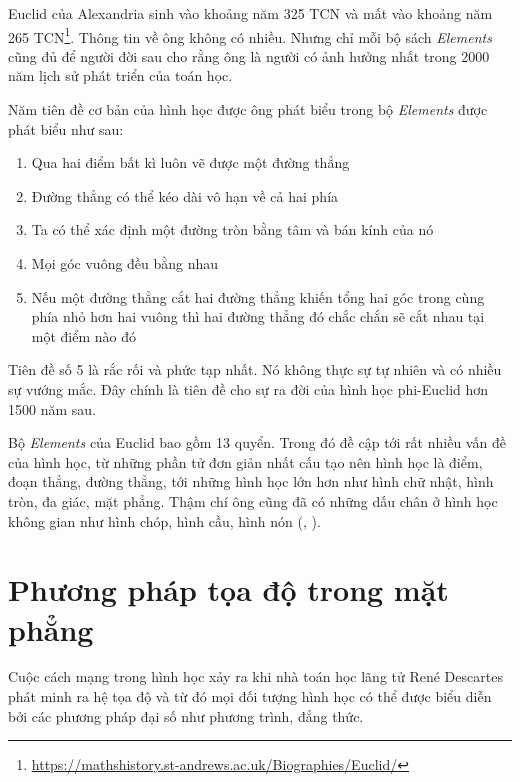 Euclid của Alexandria sinh vào khoảng năm 325 TCN và mất vào khoảng năm 265 TCN\footnote{\url{https://mathshistory.st-andrews.ac.uk/Biographies/Euclid/}}. Thông tin về ông không có nhiều. Nhưng chỉ mỗi bộ sách \textit{Elements} cũng đủ để người đời sau cho rằng ông là người có ảnh hưởng nhất trong 2000 năm lịch sử phát triển của toán học.

Năm tiên đề cơ bản của hình học được ông phát biểu trong bộ \textit{Elements} được phát biểu như sau:

\begin{enumerate}
	\item Qua hai điểm bất kì luôn vẽ được một đường thẳng
	\item Đường thẳng có thể kéo dài vô hạn về cả hai phía
	\item Ta có thể xác định một đường tròn bằng tâm và bán kính của nó
	\item Mọi góc vuông đều bằng nhau
	\item Nếu một đường thẳng cắt hai đường thẳng khiến tổng hai góc trong cùng phía nhỏ hơn hai vuông thì hai đường thẳng đó chắc chắn sẽ cắt nhau tại một điểm nào đó
\end{enumerate}

Tiên đề số 5 là rắc rối và phức tạp nhất. Nó không thực sự tự nhiên và có nhiều sự vướng mắc. Đây chính là tiên đề cho sự ra đời của hình học phi-Euclid hơn 1500 năm sau.

Bộ \textit{Elements} của Euclid bao gồm 13 quyển. Trong đó đề cập tới rất nhiều vấn đề của hình học, từ những phần tử đơn giản nhất cấu tạo nên hình học là điểm, đoạn thẳng, đường thẳng, tới những hình học lớn hơn như hình chữ nhật, hình tròn, đa giác, mặt phẳng. Thậm chí ông cũng đã có những dấu chân ở hình học không gian như hình chóp, hình cầu, hình nón (\cite{Euclid}, \cite{Casey2007}).

\section{Phương pháp tọa độ trong mặt phẳng}

Cuộc cách mạng trong hình học xảy ra khi nhà toán học lãng tử René Descartes phát minh ra hệ tọa độ và từ đó mọi đối tượng hình học có thể được biểu diễn bởi các phương pháp đại số như phương trình, đẳng thức.

